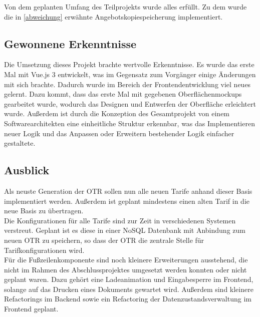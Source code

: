  Von dem geplanten Umfang des Teilprojekts wurde alles erfüllt. Zu dem wurde die in \ref{abweichung}  erwähnte Angebotskopiespeicherung implementiert.
\subsection{Gewonnene Erkenntnisse}
\label{erkenntnisse}
Die Umsetzung dieses Projekt brachte wertvolle Erkenntnisse. Es wurde das erste Mal mit Vue.js 3 entwickelt, was im Gegensatz zum Vorgänger einige Änderungen mit sich brachte. Dadurch wurde im Bereich der Frontendentwicklung viel neues gelernt. Dazu kommt, dass das erste Mal mit gegebenen Oberflächenmockups gearbeitet wurde, wodurch das Designen und Entwerfen der Oberfläche erleichtert wurde. Außerdem ist durch die Konzeption des Gesamtprojekt von einem Softwarearchitekten eine einheitliche Struktur erkennbar, was das Implementieren neuer Logik und das Anpassen oder Erweitern bestehender Logik einfacher gestaltete.
\subsection{Ausblick}
\label{ausblick}
Als neuste Generation der \ac{OTR} sollen nun alle neuen Tarife anhand dieser Basis implementiert werden. Außerdem ist geplant mindestens einen alten Tarif in die neue Basis zu übertragen.\\
Die Konfigurationen für alle Tarife sind zur Zeit in verschiedenen Systemen verstreut. Geplant ist es diese in einer NoSQL Datenbank mit Anbindung zum neuen \ac{OTR} zu speichern, so dass der \ac{OTR} die zentrale Stelle für Tarifkonfigurationen wird.\\
Für die Fußzeilenkomponente sind noch kleinere Erweiterungen ausstehend, die nicht im Rahmen des Abschlussprojektes umgesetzt werden konnten oder nicht geplant waren. Dazu gehört eine Ladeanimation und Eingabesperre im Frontend, solange auf das Drucken eines Dokuments gewartet wird. Außerdem sind kleinere Refactorings im Backend sowie ein Refactoring der Datenzustandsverwaltung im Frontend geplant.